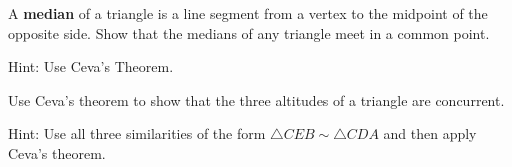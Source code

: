 \documentclass{ximera}
\begin{document}
\begin{question}
A \textbf{median} of a triangle is a line segment from a vertex
to the midpoint of the opposite side. Show that the medians of any triangle
meet in a common point.

Hint: Use Ceva's Theorem.
\end{question}

\begin{question}
Use Ceva's theorem to show that the three altitudes of a
triangle are concurrent.
\begin{image}
\end{image}
Hint: Use all three similarities of the form $\triangle
CEB\sim\triangle CDA$ and then apply Ceva's theorem.
\end{question}
\end{document}
